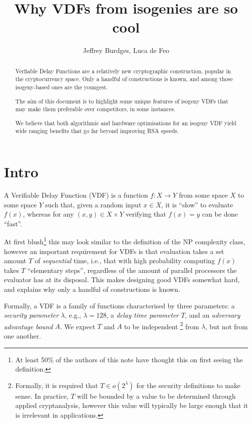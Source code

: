 \documentclass{article}
\title{Why VDFs from isogenies are so cool}
\author{Jeffrey Burdges, Luca de Feo}
\date{}
\begin{document}
\maketitle

\begin{abstract}
  Verfiable Delay Functions are a relatively new cryptographic
  construction, popular in the cryptocurrency space. Only a handful of
  constructions is known, and among those isogeny-based ones are the
  youngest.

  The aim of this document is to highlight some unique features of
  isogeny VDFs that may make them preferable over competitors, in some
  instances.

  We believe that both algorithmic and hardware optimisations for an
  isogeny VDF yield wide ranging benefits that go far beyond improving
  RSA speeds.
\end{abstract}


\section{Intro}

A Verifiable Delay Function (VDF) is a function $f: X → Y$ from some
space $X$ to some space $Y$ such that, given a random input $x ∈ X$,
it is ``slow'' to evaluate $f(x)$, whereas for any $(x,y) ∈ X×Y$
verifying that $f(x) = y$ can be done ``fast''.

At first blush\footnote{At least 50\% of the authors of this note have
  thought this on first seeing the definition.} this may look similar
to the definition of the NP complexity class, however an important
requirement for VDFs is that evaluation takes a set amount $T$ of
\emph{sequential} time, i.e., that with high probability computing
$f(x)$ takes $T$ ``elementary steps'', regardless of the amount of
parallel processors the evaluator has at its disposal.  This makes
designing good VDFs somewhat hard, and explains why only a handful of
constructions is known.

Formally, a VDF is a family of functions characterised by three
parameters:
a \emph{security parameter} $λ$, e.g., $λ=128$,
a \emph{delay time parameter} $T$, and
an \emph{adversary advantage bound} $A$. 
We expect $T$ and $A$ to be independent%
\footnote{Formally, it is required that $T\in o(2^λ)$ for the
security definitions to make sense. %
In practice, $T$ will be bounded by a value to be determined
through applied cryptanalysis, however this value will typically
be large enough that it is irrelevant in applications.} from $λ$,
but not from one another.
\end{document}
